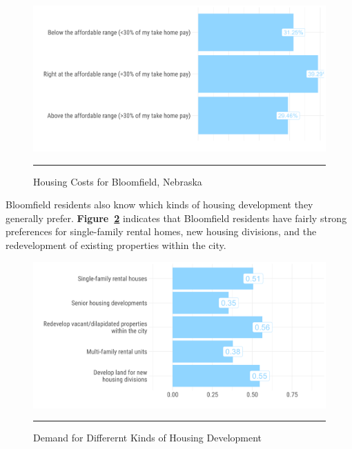 \begin{figure}[H]
\centering
\begin{framed}
    \caption{Housing Costs for Bloomfield, Nebraska}
    \label{fig:housingCostsSurvey}
    \includegraphics[width=\linewidth]{figures/survey_respondent_housing_costs.png}
    \rule[-5pt]{\linewidth}{0.4pt}
\end{framed}
\end{figure}

\noindent Bloomfield residents also know which kinds of housing development they generally prefer. \textbf{Figure~\ref{fig:bcfDemand}} indicates that Bloomfield residents have fairly strong preferences for single-family rental homes, new housing divisions, and the redevelopment of existing properties within the city.

\begin{figure}[H]
\centering
\begin{framed}
    \caption{Demand for Differernt Kinds of Housing Development}
    \label{fig:bcfDemand}
    \includegraphics[width=\linewidth]{figures/bcf_housing_demand.png}
    \rule[-5pt]{\linewidth}{0.4pt}
\end{framed}
\end{figure}

